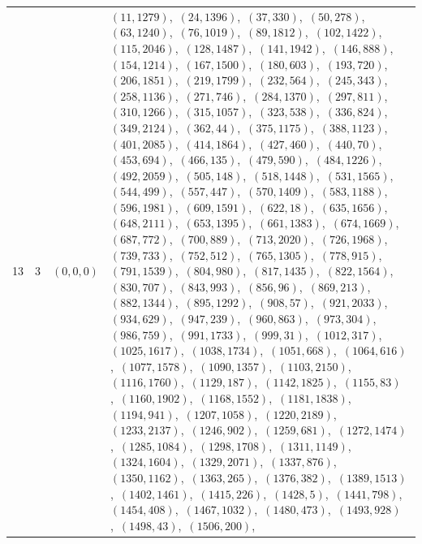 \documentclass[11pt]{article}
\begin{document}
\begin{longtable}{@{}rrl>{\raggedright\arraybackslash}p{}@{}}
13 & 3 & $(0,0,0)$ & $(11,1279)$,\allowbreak\ $(24,1396)$,\allowbreak\ $(37,330)$,\allowbreak\ $(50,278)$,\allowbreak\ $(63,1240)$,\allowbreak\ $(76,1019)$,\allowbreak\ $(89,1812)$,\allowbreak\ $(102,1422)$,\allowbreak\ $(115,2046)$,\allowbreak\ $(128,1487)$,\allowbreak\ $(141,1942)$,\allowbreak\ $(146,888)$,\allowbreak\ $(154,1214)$,\allowbreak\ $(167,1500)$,\allowbreak\ $(180,603)$,\allowbreak\ $(193,720)$,\allowbreak\ $(206,1851)$,\allowbreak\ $(219,1799)$,\allowbreak\ $(232,564)$,\allowbreak\ $(245,343)$,\allowbreak\ $(258,1136)$,\allowbreak\ $(271,746)$,\allowbreak\ $(284,1370)$,\allowbreak\ $(297,811)$,\allowbreak\ $(310,1266)$,\allowbreak\ $(315,1057)$,\allowbreak\ $(323,538)$,\allowbreak\ $(336,824)$,\allowbreak\ $(349,2124)$,\allowbreak\ $(362,44)$,\allowbreak\ $(375,1175)$,\allowbreak\ $(388,1123)$,\allowbreak\ $(401,2085)$,\allowbreak\ $(414,1864)$,\allowbreak\ $(427,460)$,\allowbreak\ $(440,70)$,\allowbreak\ $(453,694)$,\allowbreak\ $(466,135)$,\allowbreak\ $(479,590)$,\allowbreak\ $(484,1226)$,\allowbreak\ $(492,2059)$,\allowbreak\ $(505,148)$,\allowbreak\ $(518,1448)$,\allowbreak\ $(531,1565)$,\allowbreak\ $(544,499)$,\allowbreak\ $(557,447)$,\allowbreak\ $(570,1409)$,\allowbreak\ $(583,1188)$,\allowbreak\ $(596,1981)$,\allowbreak\ $(609,1591)$,\allowbreak\ $(622,18)$,\allowbreak\ $(635,1656)$,\allowbreak\ $(648,2111)$,\allowbreak\ $(653,1395)$,\allowbreak\ $(661,1383)$,\allowbreak\ $(674,1669)$,\allowbreak\ $(687,772)$,\allowbreak\ $(700,889)$,\allowbreak\ $(713,2020)$,\allowbreak\ $(726,1968)$,\allowbreak\ $(739,733)$,\allowbreak\ $(752,512)$,\allowbreak\ $(765,1305)$,\allowbreak\ $(778,915)$,\allowbreak\ $(791,1539)$,\allowbreak\ $(804,980)$,\allowbreak\ $(817,1435)$,\allowbreak\ $(822,1564)$,\allowbreak\ $(830,707)$,\allowbreak\ $(843,993)$,\allowbreak\ $(856,96)$,\allowbreak\ $(869,213)$,\allowbreak\ $(882,1344)$,\allowbreak\ $(895,1292)$,\allowbreak\ $(908,57)$,\allowbreak\ $(921,2033)$,\allowbreak\ $(934,629)$,\allowbreak\ $(947,239)$,\allowbreak\ $(960,863)$,\allowbreak\ $(973,304)$,\allowbreak\ $(986,759)$,\allowbreak\ $(991,1733)$,\allowbreak\ $(999,31)$,\allowbreak\ $(1012,317)$,\allowbreak\ $(1025,1617)$,\allowbreak\ $(1038,1734)$,\allowbreak\ $(1051,668)$,\allowbreak\ $(1064,616)$,\allowbreak\ $(1077,1578)$,\allowbreak\ $(1090,1357)$,\allowbreak\ $(1103,2150)$,\allowbreak\ $(1116,1760)$,\allowbreak\ $(1129,187)$,\allowbreak\ $(1142,1825)$,\allowbreak\ $(1155,83)$,\allowbreak\ $(1160,1902)$,\allowbreak\ $(1168,1552)$,\allowbreak\ $(1181,1838)$,\allowbreak\ $(1194,941)$,\allowbreak\ $(1207,1058)$,\allowbreak\ $(1220,2189)$,\allowbreak\ $(1233,2137)$,\allowbreak\ $(1246,902)$,\allowbreak\ $(1259,681)$,\allowbreak\ $(1272,1474)$,\allowbreak\ $(1285,1084)$,\allowbreak\ $(1298,1708)$,\allowbreak\ $(1311,1149)$,\allowbreak\ $(1324,1604)$,\allowbreak\ $(1329,2071)$,\allowbreak\ $(1337,876)$,\allowbreak\ $(1350,1162)$,\allowbreak\ $(1363,265)$,\allowbreak\ $(1376,382)$,\allowbreak\ $(1389,1513)$,\allowbreak\ $(1402,1461)$,\allowbreak\ $(1415,226)$,\allowbreak\ $(1428,5)$,\allowbreak\ $(1441,798)$,\allowbreak\ $(1454,408)$,\allowbreak\ $(1467,1032)$,\allowbreak\ $(1480,473)$,\allowbreak\ $(1493,928)$,\allowbreak\ $(1498,43)$,\allowbreak\ $(1506,200)$,\allowbreak\ 
\end{longtable}
\end{document}
